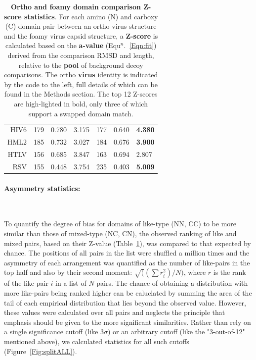 \documentclass{bmcart}
\newcommand{\Tab}[1]{Table~\ref{Tab:#1}}
\newcommand{\Fig}[1]{Figure~\ref{Fig:#1}}
\newcommand{\Eqn}[1]{Equ$^n$.~\ref{Eqn:#1}}
\begin{document}
\begin{table}
\begin{tabular}{r|lll|lll|}
HIV6   &  179  & 0.780 &      3.175  &  177  & 0.640 & {\bf 4.380} \\
HML2   &  185  & 0.732 &      3.027  &  184  & 0.676 & {\bf 3.900} \\
HTLV   &  156  & 0.685 &      3.847  &  163  & 0.694 &      2.807  \\
RSV    &  155  & 0.448 &      3.754  &  235  & 0.403 & {\bf 5.009} \\
\hline \hline
\end{tabular}
\begin{footnotesize}
\caption{
\label{Tab:Zscores}
{\bf Ortho and foamy domain comparison Z-score statistics}.
For each amino (N) and carboxy (C) domain pair between an ortho virus structure and the foamy virus capsid structure,
a {\bf Z-score} is calculated based on the {\bf a-value} (\Eqn{fit}) derived from the comparison RMSD and length,
relative to the {\bf pool} of background decoy comparisons.   The ortho {\bf virus} identity is indicated by the
code to the left, full details of which can be found in the Methods section.
The top 12 Z-scores are high-lighted in bold, only three of which support a swapped domain match.
}
\end{footnotesize}
\end{table}

\paragraph{Asymmetry statistics:}\

To quantify the degree of bias for domains of like-type (NN, CC) to be more similar than those of mixed-type (NC, CN),
the observed ranking of like and mixed pairs, based on their Z-value (\Tab{Zscores}), was compared to that expected by
chance.  The positions of all pairs in the list were shuffled a million times and the asymmetry of each arrangement was
quantified as the number of like-pairs in the top half and also by their second moment: $\surd((\sum r^2_i)/N)$, where $r$
is the rank of the like-pair $i$ in a list of $N$ pairs.  The chance of obtaining a distribution with more like-pairs
being ranked higher can be caluclated by summing the area of the tail of each empirical distribution that lies beyond the
observed value.   However, these values were calculated over all pairs and neglects the principle that emphasis should
be given to the more significant similarities.  Rather than rely on a single significance cutoff (like 3$\sigma$) or an
arbitrary cutoff (like the "3-out-of-12" mentioned above), we calculated statistics for all such cutoffs (\Fig{splitALL}).
\end{document}
